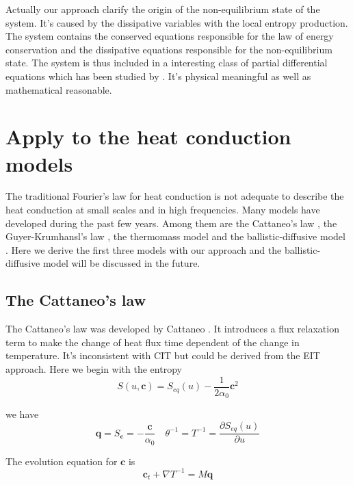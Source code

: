 \documentclass[a4paper]{article}
\begin{document}
Actually our approach clarify the origin of the non-equilibrium state of the system. It's caused by the dissipative variables with the local entropy production. The system contains the conserved equations responsible for the law of energy conservation and the dissipative equations responsible for the non-equilibrium state. The system is thus included in a interesting class of partial differential equations which has been studied by \cite{yong2008interesting}. It's physical meaningful as well as mathematical reasonable.

\section{Apply to the heat conduction models}
The traditional Fourier's law for heat conduction is not adequate to describe the heat conduction at small scales and in high frequencies. Many models have developed during the past few years. Among them are the Cattaneo's law \cite{cattaneo2011sulla}, the Guyer-Krumhansl's law \cite{guyer1966solution}, the thermomass model \cite{zeng2006motion,dong2011generalized} and the ballistic-diffusive model \cite{chen2002ballistic,chen2001ballistic}. Here we derive the first three models with our approach and the ballistic-diffusive model will be discussed in the future. 

\subsection{The Cattaneo's law}

The Cattaneo's law was developed by Cattaneo \cite{cattaneo2011sulla}. It introduces a flux relaxation term to make the change of heat flux time dependent of the change in temperature. It's inconsistent with CIT but could be derived from the EIT approach. Here we begin with the entropy 
\begin{equation}
S(u,\mathbf{c})=S_{eq}(u)-\frac{1}{2\alpha_0} \mathbf{c}^2
\end{equation}

we have
\begin{equation}
\mathbf{q}=S_{\mathbf{c}}=-\frac{\mathbf{c}}{\alpha_0} \quad \theta^{-1}=T^{-1}=\frac{\partial S_{eq}(u)}{\partial u}
\end{equation}

The evolution equation for $\mathbf{c}$ is 
\begin{equation}
\mathbf{c}_t+\nabla T^{-1} =M\mathbf{q}
\end{equation}
\end{document}

